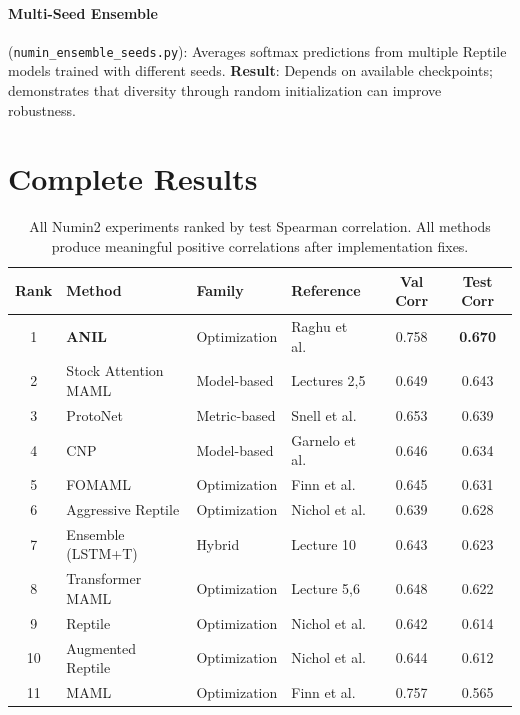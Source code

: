 \documentclass[11pt,a4paper]{article}
\begin{document}
\paragraph{Multi-Seed Ensemble} (\texttt{numin\_ensemble\_seeds.py}): Averages softmax predictions from multiple Reptile models trained with different seeds. \textbf{Result}: Depends on available checkpoints; demonstrates that diversity through random initialization can improve robustness.

\section{Complete Results}

\begin{table}[H]\centering
\caption{All Numin2 experiments ranked by test Spearman correlation. All methods produce meaningful positive correlations after implementation fixes.}
\vspace{4pt}
\begin{tabular}{clllcc}\toprule
\textbf{Rank} & \textbf{Method} & \textbf{Family} & \textbf{Reference} & \textbf{Val Corr} & \textbf{Test Corr} \\\midrule
\rowcolor{green!8} 1 & \textbf{ANIL} & Optimization & Raghu et al.\ \cite{raghu2020} & 0.758 & \textcolor{bestgreen}{\textbf{0.670}} \\
\rowcolor{green!5} 2 & Stock Attention MAML & Model-based & Lectures 2,5 & 0.649 & 0.643 \\
\rowcolor{green!5} 3 & ProtoNet & Metric-based & Snell et al.\ \cite{snell2017} & 0.653 & 0.639 \\
4 & CNP & Model-based & Garnelo et al.\ \cite{garnelo2018} & 0.646 & 0.634 \\
5 & FOMAML & Optimization & Finn et al.\ \cite{finn2017} & 0.645 & 0.631 \\
6 & Aggressive Reptile & Optimization & Nichol et al.\ \cite{nichol2018} & 0.639 & 0.628 \\
7 & Ensemble (LSTM+T) & Hybrid & Lecture 10 & 0.643 & 0.623 \\
8 & Transformer MAML & Optimization & Lecture 5,6 & 0.648 & 0.622 \\
9 & Reptile & Optimization & Nichol et al.\ \cite{nichol2018} & 0.642 & 0.614 \\
10 & Augmented Reptile & Optimization & Nichol et al.\ \cite{nichol2018} & 0.644 & 0.612 \\
11 & MAML & Optimization & Finn et al.\ \cite{finn2017} & 0.757 & 0.565 \\
\bottomrule\end{tabular}
\end{table}
\end{document}
